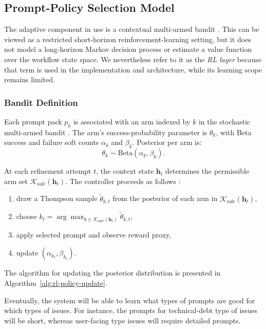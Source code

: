 \documentclass[manuscript,review]{acmart}
\begin{document}
\subsection{Prompt-Policy Selection Model}

The adaptive component in use is a contextual multi-armed bandit \cite{R86}. This can be viewed as a restricted short-horizon reinforcement-learning setting, but it does not model a long-horizon Markov decision process or estimate a value function over the workflow state space. We nevertheless refer to it as the \emph{RL layer} because that term is used in the implementation and architecture, while its learning scope remains limited.

\subsubsection{Bandit Definition}
Each prompt pack $p_k$ is associated with an arm indexed by $k$ in the stochastic multi-armed bandit \cite{R84}. The arm's success-probability parameter is $\theta_k$, with Beta success and failure soft counts $\alpha_k$ and $\beta_k$. Posterior per arm is:
\begin{equation}
\theta_k \sim \text{Beta}(\alpha_k, \beta_k).
\end{equation}

At each refinement attempt $t$, the context state $\mathbf{h}_t$ determines the permissible arm set $\mathcal{K}_{\mathrm{safe}}(\mathbf{h}_t)$. The controller proceeds as follows \cite{R85}:
\begin{enumerate}
  \item draw a Thompson sample $\widetilde{\theta}_{k,t}$ from the posterior of each arm in $\mathcal{K}_{\mathrm{safe}}(\mathbf{h}_t)$,
  \item choose $k_t = \arg\max_{k\in\mathcal{K}_{\mathrm{safe}}(\mathbf{h}_t)} \widetilde{\theta}_{k,t}$,
  \item apply selected prompt and observe reward proxy,
  \item update $(\alpha_{k_t},\beta_{k_t})$.
\end{enumerate}
The algorithm for updating the posterior distribution is presented in Algorithm~\ref{alg:rl-policy-update}.

Eventually, the system will be able to learn what types of prompts are good for which types of issues. For instance, the prompts for technical-debt type of issues will be short, whereas user-facing type issues will require detailed prompts.
\end{document}
